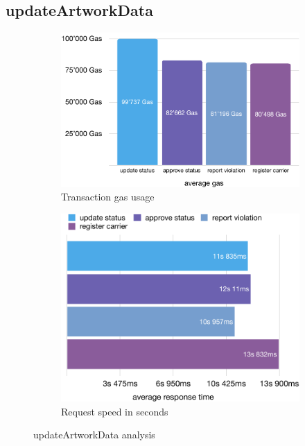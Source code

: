 \subsection*{updateArtworkData}
\begin{figure}[h!]
    \begin{subfigure}{0.49\textwidth}
        \includegraphics[width=\textwidth]{diagrams/updateArtworkData_gas_eval.pdf}
        \caption{Transaction gas usage}
        \label{fig:updateArtworkData_tx_cost}
    \end{subfigure}
    \hfill
    \begin{subfigure}{0.49\textwidth}
        \includegraphics[width=\textwidth]{diagrams/updateArtworkData_request_time_eval.pdf}
        \caption{Request speed in seconds}
        \label{fig:updateArtworkData_tx_speed}
    \end{subfigure}
    \caption{updateArtworkData analysis}
    \label{fig:updateArtworkData_analysis}
\end{figure}

